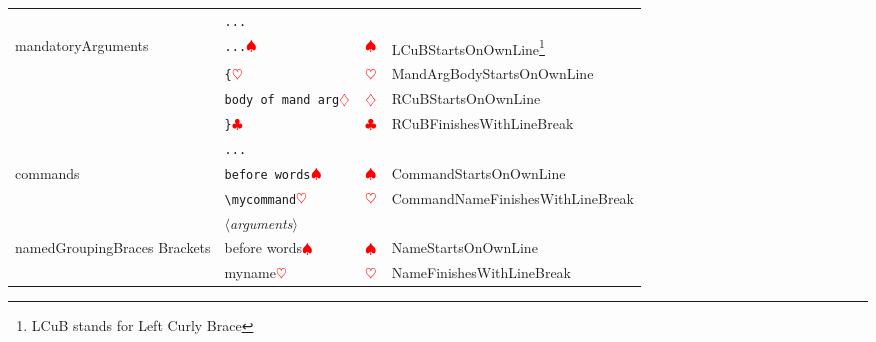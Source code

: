 \begin{longtable}{llll}
		                                       & \verb!...!                             &                                         &                                                                   \\
		\cmidrule{2-4}
		mandatoryArguments                     & \verb!...!$\color{red}\spadesuit$      & $\color{red}\spadesuit$                 & LCuBStartsOnOwnLine\footnote{LCuB stands for Left Curly Brace}    \\
		                                       & \verb!{!$\color{red}\heartsuit$       & $\color{red}\heartsuit$                  & MandArgBodyStartsOnOwnLine                                        \\
		                                       & \verb!body of mand arg!$\color{red}\diamondsuit$        & $\color{red}\diamondsuit$                   & RCuBStartsOnOwnLine                                               \\
		                                       & \verb!}!$\color{red}\clubsuit$  & $\color{red}\clubsuit$             & RCuBFinishesWithLineBreak                                         \\
		                                       & \verb!...!                             &                                         &                                                                   \\
		\cmidrule{2-4}
		commands                               & \verb!before words!$\color{red}\spadesuit$      & $\color{red}\spadesuit$                 & CommandStartsOnOwnLine                                            \\
		                                       & \verb!\mycommand!$\color{red}\heartsuit$       & $\color{red}\heartsuit$                  & CommandNameFinishesWithLineBreak                                  \\
		                                       & $\langle$\itshape{arguments}$\rangle$                   &                                         &                                                                   \\
		\cmidrule{2-4}
		namedGroupingBraces Brackets           & before words$\color{red}\spadesuit$                     & $\color{red}\spadesuit$                 & NameStartsOnOwnLine                                               \\
		                                       & myname$\color{red}\heartsuit$                            & $\color{red}\heartsuit$                  & NameFinishesWithLineBreak                                         \\

\end{longtable}
